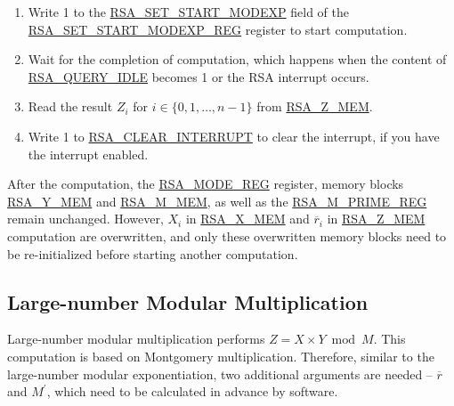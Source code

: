 \documentclass[main\_\_EN.tex]{subfiles}
\begin{document}
\begin{enumerate}
       Users need to write data to each memory block only according to the length of the number; data beyond this length is ignored.

    \item Write 1 to the \hyperref[fielddesc:RSASETSTARTMODEXP]{RSA\_SET\_START\_MODEXP} field of the \hyperref[regdesc:RSASETSTARTMODEXPREG]{RSA\_SET\_START\_MODEXP\_REG} register to start computation.

    \item Wait for the completion of computation, which happens when the content of \hyperref[fielddesc:RSAQUERYIDLE]{RSA\_QUERY\_IDLE} becomes 1 or the RSA interrupt occurs.
        
    \item Read the result \begin{math}Z_{i}\end{math}
        for \begin{math}i \in \{ 0, 1, \dots, n-1 \} \end{math}
        from \hyperref[regdesc:RSAmemory]{RSA\_Z\_MEM}.

    \item Write 1 to \hyperref[fielddesc:RSACLEARINTERRUPT]{RSA\_CLEAR\_INTERRUPT} to clear the interrupt, if you have the interrupt enabled.

\end{enumerate}

After the computation, the \hyperref[regdesc:RSAMODEREG]{RSA\_MODE\_REG} register, memory blocks \hyperref[regdesc:RSAmemory]{RSA\_Y\_MEM} and \hyperref[regdesc:RSAmemory]{RSA\_M\_MEM}, as well as the \hyperref[regdesc:RSAMPRIMEREG]{RSA\_M\_PRIME\_REG} remain unchanged. However, \begin{math}X_{i}\end{math} in \hyperref[regdesc:RSAmemory]{RSA\_X\_MEM} and \begin{math}\overline{r}_{i}\end{math} in \hyperref[regdesc:RSAmemory]{RSA\_Z\_MEM} computation are overwritten, and only these overwritten memory blocks need to be re-initialized before starting another computation.

\subsection{Large-number Modular Multiplication}

Large-number modular multiplication performs \begin{math}Z = X \times Y \bmod M\end{math}. This computation is based on Montgomery multiplication. 
Therefore, similar to the large-number modular exponentiation, two additional arguments are needed -- \begin{math}\overline{r}\end{math} and
\begin{math}M^{\prime}\end{math}, which need to be calculated in advance by software.
\end{document}
